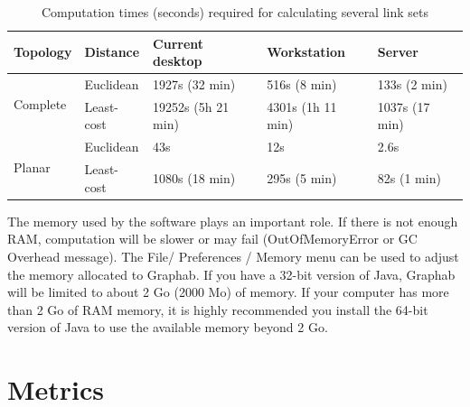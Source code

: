 \documentclass{article}
\begin{document}
\begin{table}[H]
\begin{tabular}{|l|l|l|l|l|}
\hline
Topology & Distance & Current desktop & Workstation  & Server\\
\hline
\multirow{2}{*}{Complete}
 & Euclidean & 1927s (32 min) & 516s (8 min) & 133s (2 min)\\
\hhline{~----}
 & Least-cost & 19252s (5h 21 min) & 4301s (1h 11 min) & 1037s (17 min)\\
\hline
\multirow{2}{*}{Planar}
 & Euclidean & 43s & 12s & 2.6s\\
\hhline{~----}
 & Least-cost & 1080s (18 min) & 295s (5 min) & 82s (1 min)\\
\hline
\end{tabular}
\caption{Computation times (seconds) required for calculating several link sets}
\label{perf}
\end{table}

The memory used by the software plays an important role. If there is not enough RAM, computation will be slower or may fail (OutOfMemoryError or GC Overhead message). The File/ Preferences / Memory menu can be used to adjust the memory allocated to Graphab. If you have a 32-bit version of Java, Graphab will be limited to about 2 Go (2000 Mo) of memory. If your computer has more than 2 Go of RAM memory, it is highly
recommended you install the 64-bit version of Java to use the available memory beyond 2 Go.


\section{Metrics}
\end{document}
